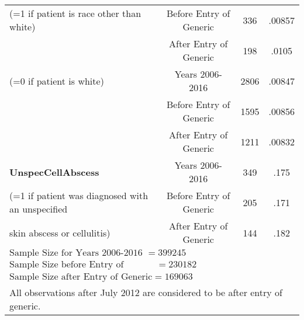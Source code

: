 \begin{tabular}{l*{3}{c}}
(=1 if patient is race other than white)                &     Before Entry of Generic&     336&      .00857\\
                                                        &     After Entry of Generic&      198&      .0105\\
[.5em]
(=0 if patient is white)                                &     Years 2006-2016&             2806&      .00847\\
                                                        &     Before Entry of Generic&     1595&      .00856\\
                                                        &     After Entry of Generic&      1211&      .00832\\
[.5em]
\textbf{UnspecCellAbscess}                              &     Years 2006-2016&             349 &      .175\\
(=1 if patient was diagnosed with an unspecified        &     Before Entry of Generic&     205 &      .171\\
 skin abscess or cellulitis)                            &     After Entry of Generic&      144  &      .182\\
\hline
$\text{Sample Size for Years 2006-2016 }= 399245$\\
$\text{Sample Size before Entry of Generic} = 230182$\\
$\text{Sample Size after Entry of Generic} = 169063$\\
\hline\hline
\multicolumn{4}{l}{\footnotesize All observations after July 2012 are considered to be after entry of generic.}\\
\end{tabular}


